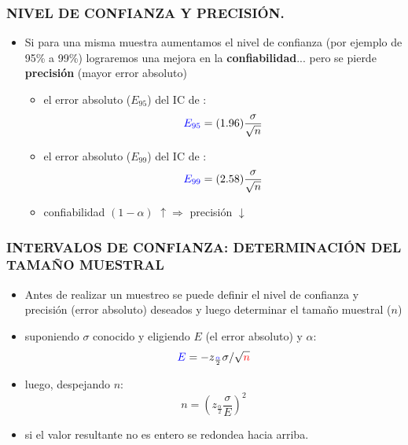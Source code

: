 \documentclass{beamer}
\begin{document}
\begin{frame}
\frametitle{ NIVEL DE CONFIANZA Y PRECISIÓN.}


\begin{itemize}
\item Si para una misma muestra aumentamos el nivel de confianza
(por ejemplo de 95\% a 99\%) lograremos una mejora en la
\textbf{confiabilidad}... pero se pierde \textbf{precisión} (mayor error absoluto)
\begin{itemize}
\item el error absoluto ($E_{95}$) del IC de {\color{blue}{95\%}}:
$${\color{blue}{E_{95}}}=(1.96)\frac{\sigma }{\sqrt{n}} $$
\item el error absoluto ($E_{99}$) del IC de {\color{blue}{99\%}}:
$${\color{blue}{E_{99}}}=(2.58)\frac{\sigma }{\sqrt{n}} $$
\item confiabilidad $(1-\alpha)$ $\uparrow \Rightarrow$ precisión  $\downarrow$
\end{itemize}
\end{itemize}
\end{frame}



\begin{frame}
\frametitle{INTERVALOS DE CONFIANZA: DETERMINACIÓN DEL TAMAÑO
MUESTRAL}

\begin{itemize}
\item Antes de realizar un muestreo se puede definir el nivel de
confianza y precisión (error absoluto) deseados y luego
determinar el tamaño muestral ($n$)
\item suponiendo $\sigma$ conocido y eligiendo $E$ (el error absoluto) y $\alpha$:
$${\color{blue}{E}}=-z_{\frac{{\color{blue}{\alpha}}}{2}}\sigma/\sqrt{{\color{red}{n}}}$$
\item luego, despejando $n$:
$$n=(z_{\frac{\alpha}{2}}\frac{\sigma}{E})^2$$
\item si el valor resultante no es entero se redondea hacia arriba.
\end{itemize}
\end{frame}


\end{document}
